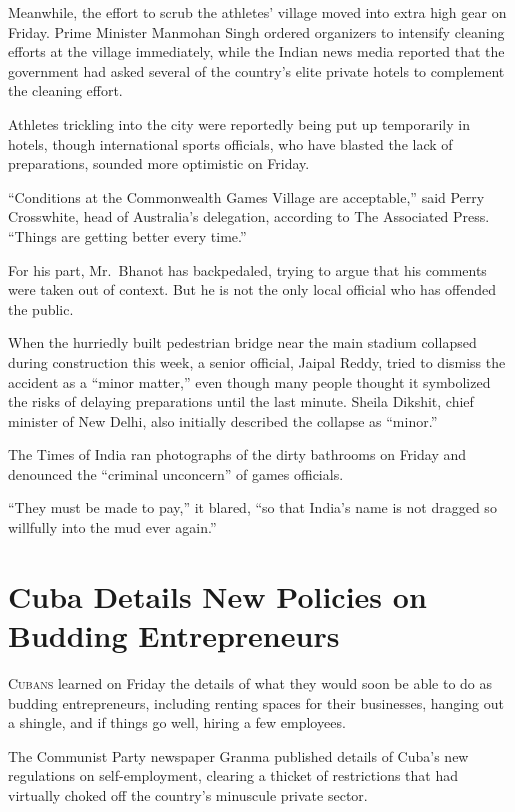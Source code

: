 ﻿\documentclass[12pt]{article}
\begin{document}
Meanwhile, the effort to scrub the athletes' village moved into extra high gear on Friday. Prime
Minister Manmohan Singh ordered organizers to intensify cleaning efforts at the village immediately,
while the Indian news media reported that the government had asked several of the country's elite
private hotels to complement the cleaning effort.

Athletes trickling into the city were reportedly being put up temporarily in hotels, though
international sports officials, who have blasted the lack of preparations, sounded more optimistic
on Friday.

``Conditions at the Commonwealth Games Village are acceptable,'' said Perry Crosswhite, head of
Australia's delegation, according to The Associated Press. ``Things are getting better every time.''

For his part, Mr.~Bhanot has backpedaled, trying to argue that his comments were taken out of
context. But he is not the only local official who has offended the public.

When the hurriedly built pedestrian bridge near the main stadium collapsed during construction this
week, a senior official, Jaipal Reddy, tried to dismiss the accident as a ``minor matter,'' even
though many people thought it symbolized the risks of delaying preparations until the last minute.
Sheila Dikshit, chief minister of New Delhi, also initially described the collapse as ``minor.''

The Times of India ran photographs of the dirty bathrooms on Friday and denounced the ``criminal
unconcern'' of games officials.

``They must be made to pay,'' it blared, ``so that India's name is not dragged so willfully into the
mud ever again.''

\pagebreak
\section{Cuba Details New Policies on Budding Entrepreneurs}

\lettrine{C}{ubans} learned on Friday the details of what they would soon
be able to do as budding entrepreneurs, including renting spaces for their businesses, hanging out a
shingle, and if things go well, hiring a few employees.

The Communist Party newspaper Granma published details of Cuba's new regulations on self-employment,
clearing a thicket of restrictions that had virtually choked off the country's minuscule private
sector.
\end{document}
